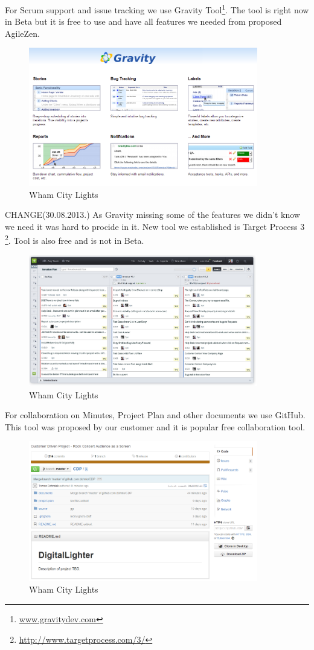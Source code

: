 For Scrum support and issue tracking we use Gravity Tool\footnote{\url{www.gravitydev.com}}. 
The tool is right now in Beta but it is free to use and have all features we needed from proposed AgileZen.

\begin{figure}[!t]
	\centering
		\includegraphics[width=10cm]{preliminaryStudies/gravity.png}
	\caption{Wham City Lights}
	\label{fig:gravity}
\end{figure}


CHANGE(30.08.2013.) As Gravity missing some of the features we didn't know we need it was hard to procide in it.
New tool we established is Target Process 3 \footnote{\url{http://www.targetprocess.com/3/}}. Tool is also free and is not in Beta.

\begin{figure}[!t]
	\centering
		\includegraphics[width=10cm]{preliminaryStudies/targetp.png}
	\caption{Wham City Lights}
	\label{fig:targetp}
\end{figure}

For collaboration on Minutes, Project Plan and other documents we use GitHub. This tool was proposed by our customer and it is popular free collaboration tool.

\begin{figure}[!t]
	\centering
		\includegraphics[width=10cm]{preliminaryStudies/git.png}
	\caption{Wham City Lights}
	\label{fig:git}
\end{figure}


